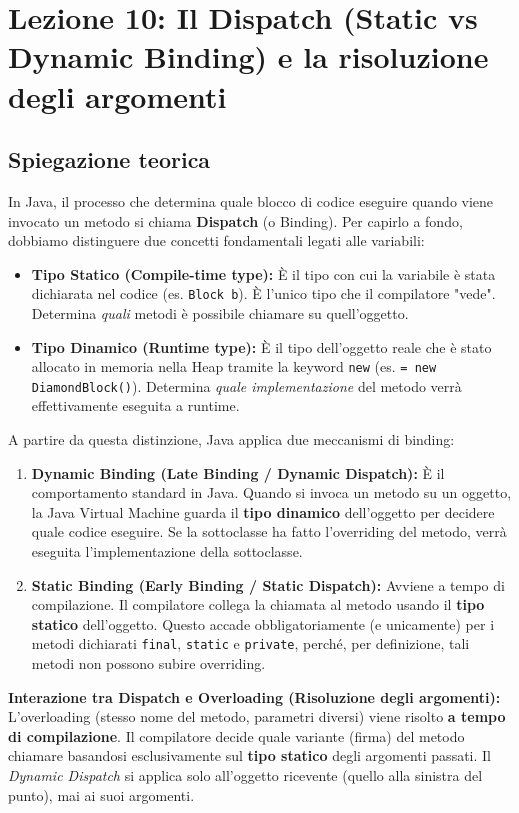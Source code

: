 \documentclass[12pt, a4paper]{article}
\begin{document}
\section{Lezione 10: Il Dispatch (Static vs Dynamic Binding) e la risoluzione degli argomenti}

\subsection{Spiegazione teorica}
In Java, il processo che determina quale blocco di codice eseguire quando viene invocato un metodo si chiama \textbf{Dispatch} (o Binding). Per capirlo a fondo, dobbiamo distinguere due concetti fondamentali legati alle variabili:
\begin{itemize}
    \item \textbf{Tipo Statico (Compile-time type):} È il tipo con cui la variabile è stata dichiarata nel codice (es. \texttt{Block b}). È l'unico tipo che il compilatore "vede". Determina \textit{quali} metodi è possibile chiamare su quell'oggetto.
    \item \textbf{Tipo Dinamico (Runtime type):} È il tipo dell'oggetto reale che è stato allocato in memoria nella Heap tramite la keyword \texttt{new} (es. \texttt{= new DiamondBlock()}). Determina \textit{quale implementazione} del metodo verrà effettivamente eseguita a runtime.
\end{itemize}

A partire da questa distinzione, Java applica due meccanismi di binding:
\begin{enumerate}
    \item \textbf{Dynamic Binding (Late Binding / Dynamic Dispatch):} È il comportamento standard in Java. Quando si invoca un metodo su un oggetto, la Java Virtual Machine guarda il \textbf{tipo dinamico} dell'oggetto per decidere quale codice eseguire. Se la sottoclasse ha fatto l'overriding del metodo, verrà eseguita l'implementazione della sottoclasse.
    \item \textbf{Static Binding (Early Binding / Static Dispatch):} Avviene a tempo di compilazione. Il compilatore collega la chiamata al metodo usando il \textbf{tipo statico} dell'oggetto. Questo accade obbligatoriamente (e unicamente) per i metodi dichiarati \texttt{final}, \texttt{static} e \texttt{private}, perché, per definizione, tali metodi non possono subire overriding.
\end{enumerate}

\textbf{Interazione tra Dispatch e Overloading (Risoluzione degli argomenti):}
L'overloading (stesso nome del metodo, parametri diversi) viene risolto \textbf{a tempo di compilazione}. Il compilatore decide quale variante (firma) del metodo chiamare basandosi esclusivamente sul \textbf{tipo statico} degli argomenti passati. Il \textit{Dynamic Dispatch} si applica solo all'oggetto ricevente (quello alla sinistra del punto), mai ai suoi argomenti.
\end{document}
